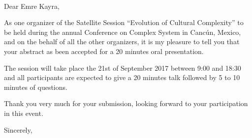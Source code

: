 \documentclass[11pt, a4paper]{letter} %
\begin{document}

\begin{letter}{
       \\
}


\opening{Dear Emre Kayra,}




As one organizer of the Satellite Session ``Evolution of Cultural Complexity'' to be held during the annual Conference on Complex System in Cancún, Mexico, and on the behalf of all the other organizers, it is my pleasure to tell you that your abstract as been accepted for a 20 minutes oral presentation. 

The session will take place the 21st of September 2017 between 9:00 and 18:30 and all participants are expected to give a 20 minutes talk followed by 5 to 10 minutes of questions.

Thank you very much for your submission, looking forward to your participation in this event.


\closing{Sincerely,}


\vfill

\def\thefootnote{}
\def\footnoterule{\hrule}
\def\thefootnote{\arabic{footnote}}
%

\end{letter}
\end{document}
